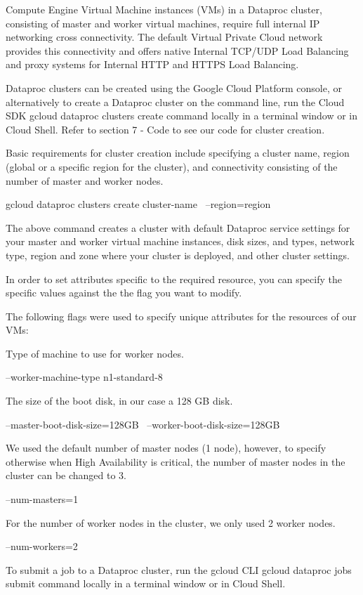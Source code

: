 \documentclass[a4paper,12pt]{article}
\begin{document}
Compute Engine Virtual Machine instances (VMs) in a Dataproc cluster, consisting of master and worker
virtual machines, require full internal IP networking cross connectivity. The default Virtual Private Cloud network provides
this connectivity and offers native Internal TCP/UDP Load Balancing and proxy systems for Internal
HTTP and HTTPS Load Balancing.

Dataproc clusters can be created using the Google Cloud Platform console, or alternatively to create a Dataproc cluster
on the command line, run the Cloud SDK gcloud dataproc clusters create command locally in a terminal window or in
Cloud Shell. Refer to section 7 - Code to see our code for cluster creation.

Basic requirements for cluster creation include specifying a cluster name, region (global or a specific region for the cluster), and
connectivity consisting of the number of master and worker nodes.

gcloud dataproc clusters create cluster-name \
--region=region

The above command creates a cluster with default Dataproc service settings for your master and worker virtual machine
instances, disk sizes, and types, network type, region and zone where your cluster is deployed, and other cluster settings.

In order to set attributes specific to the required resource, you can specify the specific values against the
the flag you want to modify.

The following flags were used to specify unique attributes for the resources of our VMs:

Type of machine to use for worker nodes.

--worker-machine-type n1-standard-8 \

The size of the boot disk, in our case a 128 GB disk.

--master-boot-disk-size=128GB \
--worker-boot-disk-size=128GB \

We used the default number of master nodes (1 node), however, to specify otherwise when High Availability is critical,
the number of master nodes in the cluster can be changed to 3.

--num-masters=1

For the number of worker nodes in the cluster, we only used 2 worker nodes.

--num-workers=2 \

To submit a job to a Dataproc cluster, run the gcloud CLI gcloud dataproc jobs submit command locally
in a terminal window or in Cloud Shell.
\end{document}
